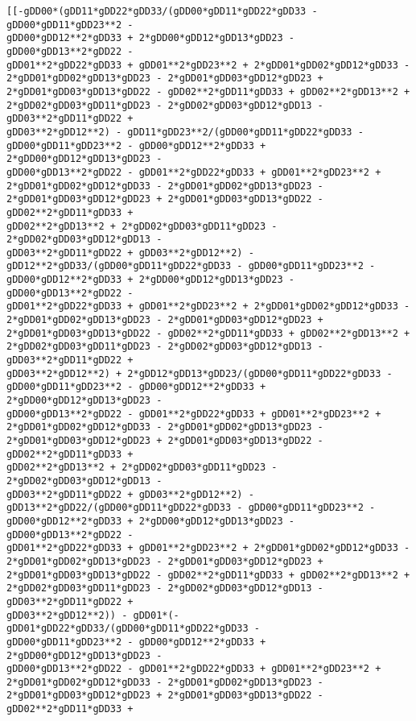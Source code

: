 \documentclass[landscape,letterpaper,10pt,english]{article}
\begin{document}
    \begin{Verbatim}[commandchars=\\\{\}]
[[-gDD00*(gDD11*gDD22*gDD33/(gDD00*gDD11*gDD22*gDD33 - gDD00*gDD11*gDD23**2 -
gDD00*gDD12**2*gDD33 + 2*gDD00*gDD12*gDD13*gDD23 - gDD00*gDD13**2*gDD22 -
gDD01**2*gDD22*gDD33 + gDD01**2*gDD23**2 + 2*gDD01*gDD02*gDD12*gDD33 -
2*gDD01*gDD02*gDD13*gDD23 - 2*gDD01*gDD03*gDD12*gDD23 +
2*gDD01*gDD03*gDD13*gDD22 - gDD02**2*gDD11*gDD33 + gDD02**2*gDD13**2 +
2*gDD02*gDD03*gDD11*gDD23 - 2*gDD02*gDD03*gDD12*gDD13 - gDD03**2*gDD11*gDD22 +
gDD03**2*gDD12**2) - gDD11*gDD23**2/(gDD00*gDD11*gDD22*gDD33 -
gDD00*gDD11*gDD23**2 - gDD00*gDD12**2*gDD33 + 2*gDD00*gDD12*gDD13*gDD23 -
gDD00*gDD13**2*gDD22 - gDD01**2*gDD22*gDD33 + gDD01**2*gDD23**2 +
2*gDD01*gDD02*gDD12*gDD33 - 2*gDD01*gDD02*gDD13*gDD23 -
2*gDD01*gDD03*gDD12*gDD23 + 2*gDD01*gDD03*gDD13*gDD22 - gDD02**2*gDD11*gDD33 +
gDD02**2*gDD13**2 + 2*gDD02*gDD03*gDD11*gDD23 - 2*gDD02*gDD03*gDD12*gDD13 -
gDD03**2*gDD11*gDD22 + gDD03**2*gDD12**2) -
gDD12**2*gDD33/(gDD00*gDD11*gDD22*gDD33 - gDD00*gDD11*gDD23**2 -
gDD00*gDD12**2*gDD33 + 2*gDD00*gDD12*gDD13*gDD23 - gDD00*gDD13**2*gDD22 -
gDD01**2*gDD22*gDD33 + gDD01**2*gDD23**2 + 2*gDD01*gDD02*gDD12*gDD33 -
2*gDD01*gDD02*gDD13*gDD23 - 2*gDD01*gDD03*gDD12*gDD23 +
2*gDD01*gDD03*gDD13*gDD22 - gDD02**2*gDD11*gDD33 + gDD02**2*gDD13**2 +
2*gDD02*gDD03*gDD11*gDD23 - 2*gDD02*gDD03*gDD12*gDD13 - gDD03**2*gDD11*gDD22 +
gDD03**2*gDD12**2) + 2*gDD12*gDD13*gDD23/(gDD00*gDD11*gDD22*gDD33 -
gDD00*gDD11*gDD23**2 - gDD00*gDD12**2*gDD33 + 2*gDD00*gDD12*gDD13*gDD23 -
gDD00*gDD13**2*gDD22 - gDD01**2*gDD22*gDD33 + gDD01**2*gDD23**2 +
2*gDD01*gDD02*gDD12*gDD33 - 2*gDD01*gDD02*gDD13*gDD23 -
2*gDD01*gDD03*gDD12*gDD23 + 2*gDD01*gDD03*gDD13*gDD22 - gDD02**2*gDD11*gDD33 +
gDD02**2*gDD13**2 + 2*gDD02*gDD03*gDD11*gDD23 - 2*gDD02*gDD03*gDD12*gDD13 -
gDD03**2*gDD11*gDD22 + gDD03**2*gDD12**2) -
gDD13**2*gDD22/(gDD00*gDD11*gDD22*gDD33 - gDD00*gDD11*gDD23**2 -
gDD00*gDD12**2*gDD33 + 2*gDD00*gDD12*gDD13*gDD23 - gDD00*gDD13**2*gDD22 -
gDD01**2*gDD22*gDD33 + gDD01**2*gDD23**2 + 2*gDD01*gDD02*gDD12*gDD33 -
2*gDD01*gDD02*gDD13*gDD23 - 2*gDD01*gDD03*gDD12*gDD23 +
2*gDD01*gDD03*gDD13*gDD22 - gDD02**2*gDD11*gDD33 + gDD02**2*gDD13**2 +
2*gDD02*gDD03*gDD11*gDD23 - 2*gDD02*gDD03*gDD12*gDD13 - gDD03**2*gDD11*gDD22 +
gDD03**2*gDD12**2)) - gDD01*(-gDD01*gDD22*gDD33/(gDD00*gDD11*gDD22*gDD33 -
gDD00*gDD11*gDD23**2 - gDD00*gDD12**2*gDD33 + 2*gDD00*gDD12*gDD13*gDD23 -
gDD00*gDD13**2*gDD22 - gDD01**2*gDD22*gDD33 + gDD01**2*gDD23**2 +
2*gDD01*gDD02*gDD12*gDD33 - 2*gDD01*gDD02*gDD13*gDD23 -
2*gDD01*gDD03*gDD12*gDD23 + 2*gDD01*gDD03*gDD13*gDD22 - gDD02**2*gDD11*gDD33 +

\end{Verbatim}
\end{document}
